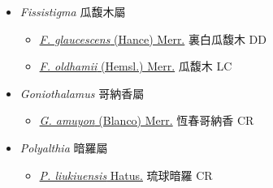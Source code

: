 
  \begin{itemize}
 \item[] \textit{Fissistigma} 瓜馥木屬
                    
  \begin{itemize}
        \item[] \href{http://www.theplantlist.org/tpl1.1/search?q=Fissistigma+glaucescens}{\textit{F. glaucescens} (Hance) Merr.}   裏白瓜馥木 DD
        \item[] \href{http://www.theplantlist.org/tpl1.1/search?q=Fissistigma+oldhamii}{\textit{F. oldhamii} (Hemsl.) Merr.}   瓜馥木 LC
  \end{itemize}
 \item[] \textit{Goniothalamus} 哥納香屬
                    
  \begin{itemize}
        \item[] \href{http://www.theplantlist.org/tpl1.1/search?q=Goniothalamus+amuyon}{\textit{G. amuyon} (Blanco) Merr.}   恆春哥納香 CR
  \end{itemize}
 \item[] \textit{Polyalthia} 暗羅屬
                    
  \begin{itemize}
        \item[] \href{http://www.theplantlist.org/tpl1.1/search?q=Polyalthia+liukiuensis}{\textit{P. liukiuensis} Hatus.}   琉球暗羅 CR
  \end{itemize}
  \end{itemize}

